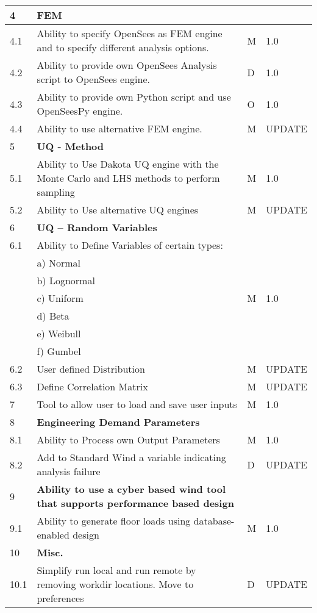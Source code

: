 {\begin{longtable}{| p{} | p{} | p{} | p{} |}
	4 & \textbf{FEM} &  &  \\ \hline
	4.1 & Ability to specify OpenSees as FEM engine and to specify different analysis options. & M & 1.0 \\ \hline
	4.2 & Ability to provide own OpenSees Analysis script to OpenSees engine. & D & 1.0 \\ \hline
	4.3 & Ability to provide own Python script and use OpenSeesPy engine. & O & 1.0 \\ \hline
	4.4 & Ability to use alternative FEM engine. & M & UPDATE \\ \hline
	5 & \textbf{UQ - Method} &  &  \\ \hline
	5.1 & Ability to Use Dakota UQ engine with the Monte Carlo and LHS methods to perform sampling & M & 1.0 \\ \hline
	5.2 & Ability to Use alternative UQ engines & M & UPDATE \\ \hline
    6 & \textbf{UQ – Random Variables} &  &  \\ \hline
	6.1 & Ability to Define Variables of certain types: &  &  \\ 
	 & a)     Normal &  &  \\ 
	 & b)     Lognormal &  &  \\ 
	 & c)     Uniform & M  & 1.0 \\ 
	 & d)     Beta &  &  \\ 
	 & e)     Weibull &  &  \\ 
	 & f)     Gumbel &  &  \\ \hline
	6.2 & User defined Distribution & M & UPDATE \\ \hline
	6.3 & Define Correlation Matrix & M & UPDATE \\ \hline
	7 & Tool to allow user to load and save user inputs & M & 1.0 \\ \hline
    8 & \textbf{Engineering Demand Parameters} &  &  \\ \hline
	8.1 & Ability to Process own Output Parameters & M & 1.0 \\ \hline
	8.2 & Add to Standard Wind a variable indicating analysis failure & D & UPDATE  \\ \hline
    9 & \textbf{Ability to use a cyber based wind tool that supports performance based design} & & \\ \hline
    9.1 & Ability to generate floor loads using database-enabled design & M & 1.0 \\ \hline
    10 & \textbf{Misc.} &  &  \\ \hline
	10.1 & Simplify run local and run remote by removing workdir locations. Move to preferences & D & UPDATE  \\ \hline

\end{longtable}}

